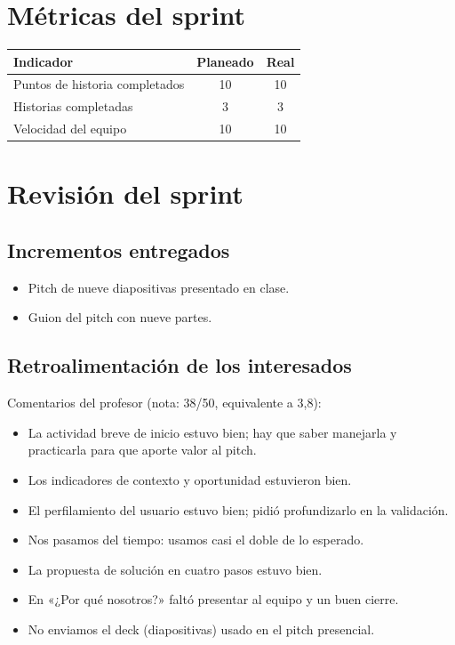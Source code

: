 \documentclass[11pt,a4paper]{article}
\begin{document}
\section{Métricas del sprint}

\begin{tabularx}{\textwidth}{X c c}
  \toprule
  \textbf{Indicador} & \textbf{Planeado} & \textbf{Real} \\
  \midrule
  Puntos de historia completados & 10 & 10 \\
  Historias completadas          & 3 & 3 \\
  Velocidad del equipo           & 10 & 10 \\
  \bottomrule
\end{tabularx}

\section{Revisión del sprint}

\subsection{Incrementos entregados}
\begin{itemize}[leftmargin=1.5em]
  \item {Pitch de nueve diapositivas presentado en clase.}
  \item {Guion del pitch con nueve partes.}
\end{itemize}

\subsection{Retroalimentación de los interesados}
{Comentarios del profesor (nota: 38/50, equivalente a 3,8):}
\begin{itemize}[leftmargin=1.5em]
  \item {La actividad breve de inicio estuvo bien; hay que saber manejarla y practicarla para que aporte valor al pitch.}
  \item {Los indicadores de contexto y oportunidad estuvieron bien.}
  \item {El perfilamiento del usuario estuvo bien; pidió profundizarlo en la validación.}
  \item {Nos pasamos del tiempo: usamos casi el doble de lo esperado.}
  \item {La propuesta de solución en cuatro pasos estuvo bien.}
  \item {En «¿Por qué nosotros?» faltó presentar al equipo y un buen cierre.}
  \item {No enviamos el deck (diapositivas) usado en el pitch presencial.}
\end{itemize}
\end{document}
